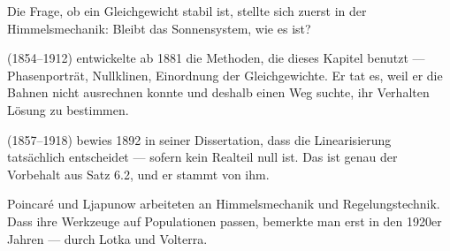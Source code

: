\begin{geschichte}
Die Frage, ob ein Gleichgewicht stabil ist, stellte sich zuerst in der Himmelsmechanik: Bleibt das Sonnensystem, wie es ist?

 (1854--1912) entwickelte ab 1881 die Methoden, die dieses Kapitel benutzt --- Phasenporträt, Nullklinen, Einordnung der Gleichgewichte. Er tat es, weil er die Bahnen nicht ausrechnen konnte und deshalb einen Weg suchte, ihr Verhalten  Lösung zu bestimmen.

\begin{center}
\begin{minipage}{0.9\textwidth}
\end{minipage}
\end{center}

 (1857--1918) bewies 1892 in seiner Dissertation, dass die Linearisierung tatsächlich entscheidet --- sofern kein Realteil null ist. Das ist genau der Vorbehalt aus Satz 6.2, und er stammt von ihm.

\begin{center}
\begin{minipage}{0.9\textwidth}
\end{minipage}
\end{center}

Poincaré und Ljapunow arbeiteten an Himmelsmechanik und Regelungstechnik. Dass ihre Werkzeuge auf Populationen passen, bemerkte man erst in den 1920er Jahren --- durch Lotka und Volterra.

\begin{center}
\begin{minipage}{0.9\textwidth}
\end{minipage}
\end{center}
\end{geschichte}

